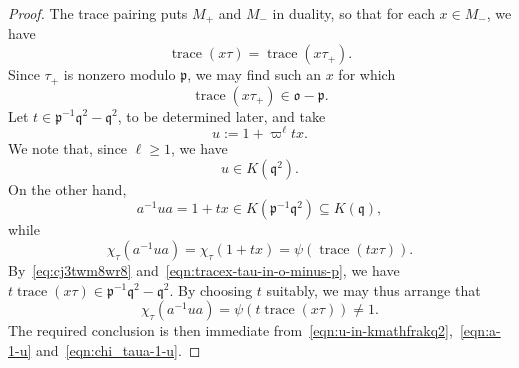 \documentclass[reqno]{amsart}
\DeclareMathOperator{\trace}{trace}
\theoremstyle{plain} \newtheorem{theorem} {Theorem} \newtheorem{conjecture} {Conjecture} \newtheorem{corollary} [theorem] {Corollary} \newtheorem{proposition} [theorem] {Proposition} \newtheorem{fact} [theorem] {Fact}
\theoremstyle{definition} \newtheorem{definition} [theorem] {Definition}
\theoremstyle{itplain} %
\newcommand{\mfq}{\mathfrak{q}}
\begin{document}
\begin{proof}
  The trace pairing puts $M_+$ and $M_-$ in duality, so that for each $x \in M_-$, we have
  \begin{equation}\label{eq:cj3twm8wr8}
    \trace(x \tau) = \trace(x \tau_+).
  \end{equation}
  Since $\tau_+$ is nonzero modulo $\mathfrak{p}$, we may find such an $x$ for which
  \begin{equation}\label{eqn:tracex-tau-in-o-minus-p}
    \trace(x \tau_+) \in \mathfrak{o} - \mathfrak{p}.
  \end{equation}
  Let $t \in \mathfrak{p} ^{-1} \mfq ^2 - \mfq ^2 $, to be determined later, and take
  \begin{equation*}
    u := 1 + \varpi^{\ell} t x.
  \end{equation*}
  We note that, since $\ell \geq 1$, we have
  \begin{equation}\label{eqn:u-in-kmathfrakq2}
    u \in K(\mfq^2).
  \end{equation}
  On the other hand,
  \begin{equation}\label{eqn:a-1-u}
    a^{-1} u a = 1 + t x \in K(\mathfrak{p}^{-1} \mfq^2) \subseteq K(\mfq),
  \end{equation}
  while
  \begin{equation*}
    \chi_\tau(a^{-1} u a) = \chi_\tau(1 + t x) = \psi(\trace(t x \tau )).
  \end{equation*}
  By~\eqref{eq:cj3twm8wr8} and~\eqref{eqn:tracex-tau-in-o-minus-p}, we have $t \trace( x \tau) \in \mathfrak{p}^{-1} \mfq^2 - \mfq^2$.  By choosing $t$ suitably, we may thus arrange that
  \begin{equation}\label{eqn:chi_taua-1-u}
    \chi_\tau(a^{-1} u a) = \psi(t \trace(x \tau)) \neq 1.
  \end{equation}
  The required conclusion is then immediate from~\eqref{eqn:u-in-kmathfrakq2},~\eqref{eqn:a-1-u} and~\eqref{eqn:chi_taua-1-u}.
\end{proof}
\end{document}

